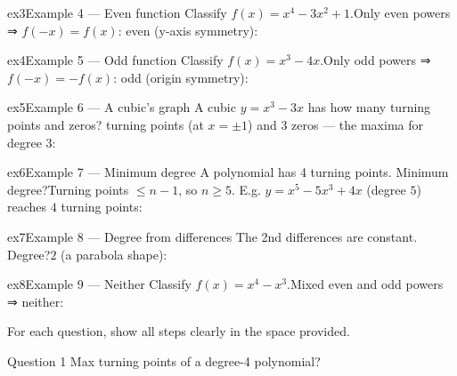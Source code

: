 \documentclass[11pt]{article}
\begin{document}
\begin{example}{ex3}{Example 4 --- Even function}
Classify $f(x)=x^4-3x^2+1$.\soln Only even powers ⇒ $f(-x)=f(x)$: even (y-axis symmetry):
\end{example}

\begin{example}{ex4}{Example 5 --- Odd function}
Classify $f(x)=x^3-4x$.\soln Only odd powers ⇒ $f(-x)=-f(x)$: odd (origin symmetry):
\end{example}

\begin{example}{ex5}{Example 6 --- A cubic's graph}
A cubic $y=x^3-3x$ has how many turning points and zeros? turning points (at $x=\pm1$) and 3 zeros — the maxima for degree 3:
\end{example}

\begin{example}{ex6}{Example 7 --- Minimum degree}
A polynomial has 4 turning points. Minimum degree?\soln Turning points $\le n-1$, so $n\ge5$. E.g. $y=x^5-5x^3+4x$ (degree $5$) reaches $4$ turning points:
\end{example}

\begin{example}{ex7}{Example 8 --- Degree from differences}
The 2nd differences are constant. Degree?\soln $2$ (a parabola shape):
\end{example}

\begin{example}{ex8}{Example 9 --- Neither}
Classify $f(x)=x^4-x^3$.\soln Mixed even and odd powers ⇒ neither:
\end{example}

\clearpage
{}
For each question, show all steps clearly in the space provided.

\begin{qbox}{Question 1}
Max turning points of a degree-4 polynomial?\workspace{2.4cm}
\end{qbox}
\end{document}
